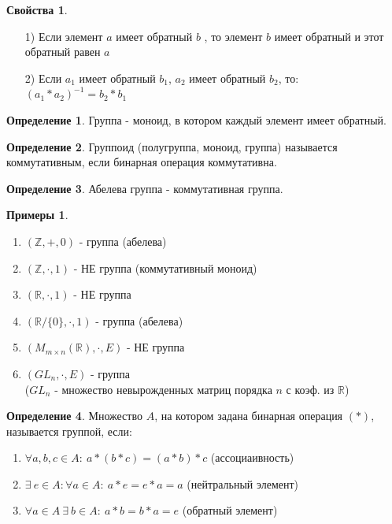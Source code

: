 \documentclass[a4paper, 12pt]{article}
\newcommand{\R}{\mathbb R}
\newcommand{\Z}{\mathbb Z}
\newcommand\tab[1][.5cm]{\hspace*{#1}}
\theoremstyle{definition}
\newtheorem*{definition}{Определение}
\newtheorem*{example}{Примеры}
\newtheorem*{properties}{Свойства}
\begin{document}
  \begin{properties}
    \begin{itemize} \tab
      \item[1)] Если элемент $a$  имеет обратный $b$ , то элемент $b$ имеет обратный и этот обратный равен $a$
      \item[2)] Если $a_1$ имеет обратный $b_1$, $a_2$ имеет обратный $b_2$, то: $(a_1*a_2)^{-1} = b_2*b_1$ 
    \end{itemize}
  \end{properties}
  \begin{definition}
    Группа - моноид, в котором каждый элемент имеет обратный.
  \end{definition}
  \begin{definition}
    Группоид (полугруппа, моноид, группа) называется коммутативным, если бинарная операция коммутативна.
  \end{definition} 
  \begin{definition}
    Абелева группа - коммутативная группа. 
  \end{definition}
  \begin{example}
    \begin{enumerate} \tab
      \item $(\Z, +, 0)$ - группа (абелева)
      \item $(\Z, \cdot, 1)$ - НЕ группа (коммутативный моноид)
      \item $(\R, \cdot, 1)$ - НЕ группа
      \item $(\R/\{0\}, \cdot, 1)$ - группа (абелева)
      \item $(M_{m \times n}(\R), \cdot, E)$ - НЕ группа
      \item $(GL_n, \cdot, E)$ - группа \\($GL_n$ - множество невырожденных матриц порядка $n$ с коэф. из $\R$)
    \end{enumerate}
  \end{example} 
  \begin{definition}
    Множество $A$, на котором задана бинарная операция $(*)$, называется группой, если:
    \begin{enumerate}
      \item  $\forall a,b,c \in A: \ a*(b*c)=(a*b)*c$ (ассоциаивность)
      \item $\exists \ e \in A: \forall a \in A: \ a*e = e*a = a$ (нейтральный элемент)
      \item $\forall a \in A \ \exists \ b \in A: \ a*b = b*a = e $ (обратный элемент)
    \end{enumerate}
  \end{definition} 
\end{document}
